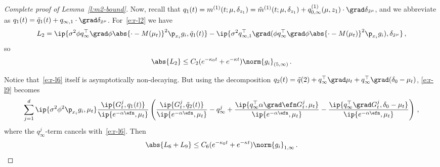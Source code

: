 \documentclass{amsart}
\begin{document}
\begin{proof}[Complete proof of Lemma~\ref{l:m2-bound}]
	Now, recall that $q_1(t) = m^{(1)}(t;\mu,\delta_{z_1}) = \tilde m^{(1)}(t;\mu,\delta_{z_1}) + q^{(1)}_{0,\infty}(\mu,z_1) \cdot \grad \delta_{\tilde x^\mu}$, 
	and we abbreviate as $q_1(t) = \tilde q_1(t) + q_{\infty,1} \cdot \grad \delta_{\tilde x^\mu}$. 
	For~\eqref{e:r-l2} we have 
	\begin{equation*}
		L_2 = \ip{\sigma^2 \phi q_\infty^\top \grad \phi \abs{\cdot-M(\mu_t)}^2 \p_{x_i} g_i, \tilde q_1(t)} - \ip{\sigma^2 q_{\infty,1}^\top \grad (\phi q_\infty^\top \grad \phi \abs{\cdot-M(\mu_t)}^2 \p_{x_i} g_i), \delta_{\tilde x^\mu}} \,,
	\end{equation*}
	so 
	\begin{equation*}
		\abs{L_2} \le C_2 (e^{-\kappa_0 t} + e^{-\kappa t}) \norm{g_i}_{(5,\infty)} \,.
	\end{equation*}

	Notice that~\eqref{e:r-l6} itself is asymptotically non-decaying.
	But using the decomposition $q_2(t) = \tilde q(2) + q_\infty^\top \grad \mu_t + q_\infty^\top \grad (\delta_0 - \mu_t)$, \eqref{e:r-l9} becomes
	\begin{align*}
		\sum_{j=1}^d \ip{\sigma^2 \phi^2 \p_{x_i} g_i, \mu_t} \frac{\ip{G_t^j, q_1(t)}}{\ip{e^{-\alpha\efn}, \mu_t}}  \left( \frac{\ip{G_t^j, \tilde q_2(t)}}{\ip{e^{-\alpha\efn}, \mu_t}} - q_\infty^j + \frac{\ip{q_\infty^\top \alpha \grad \efn G_t^j, \mu_t}}{\ip{e^{-\alpha\efn}, \mu_t}} - \frac{\ip{q_\infty^\top \grad G_t^j, \delta_0-\mu_t}}{\ip{e^{-\alpha\efn}, \mu_t}} \right) \,,
	\end{align*}
	where the $q_\infty^j$-term cancels with~\eqref{e:r-l6}. 
	Then 
	\begin{equation*}
		\abs{L_6 + L_9} \le C_6 (e^{-\kappa_0 t} + e^{-\kappa t}) \norm{g_i}_{1,\infty} \,.
	\end{equation*}


\end{proof}
\end{document}
